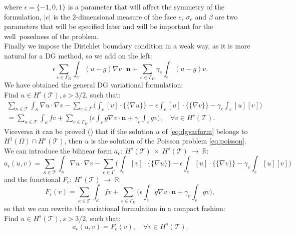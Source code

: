 \documentclass[12pt, a4paper]{article}
\theoremstyle{definition}
\theoremstyle{plain}
\theoremstyle{plain}
\begin{document}
where $\epsilon = \{-1, 0, 1\}$ is a parameter that will affect the symmetry of the formulation, $|e|$ is the $2$-dimensional measure of the face $e$, $\sigma_e$ and $\beta$ are two parameters that will be specified later and will be important for the well~posedness of the problem.\\
Finally we impose the Dirichlet boundary condition in a weak way, as it is more natural for a DG method, so we add on the left:
\begin{equation*}
	\epsilon \sum_{e \in \Gamma_D} \int_e (u-g) \nabla v \cdot \mathbf{n}
	+ \sum_{e \in \Gamma_D} \gamma_e \int_e (u-g)v.
\end{equation*}
We have obtained the general DG variational formulation:\\
Find $u \in H^s(\mathcal{T}), s>3/2$, such that:
\begin{multline*}
	\sum_{\kappa \in \mathcal{T}} \int_\kappa \nabla u \cdot \nabla v 
	-\sum_{e \in \Gamma} \bigg( \int_e [v] \cdot \{\!\!\{ \nabla u \}\!\!\}
	-\epsilon \int_e [u] \cdot \{\!\!\{ \nabla v \}\!\!\}
	- \gamma_e \int_e [u][v] \bigg)\\
	= \sum_{\kappa \in \mathcal{T}} \int_\kappa fv
	+ \sum_{e \in \Gamma_D} \bigg( \epsilon \int_e g \nabla v \cdot \mathbf{n}
	+ \gamma_e \int_e gv \bigg), \quad \forall v \in H^s(\mathcal{T}).
\end{multline*}
Viceversa it can be proved (\cite{riviere}) that if the solution $u$ of \eqref{eq:dgvarform} belongs to $H^1(\Omega) \cap H^s(\mathcal{T})$, then $u$ is the solution of the Poisson problem \eqref{eq:poisson}.\\
We can introduce the bilinear form $a_\epsilon:~H^s(\mathcal{T})~\times~H^s(\mathcal{T})~\rightarrow~\mathbb{R}$:
\begin{equation*}
a_\epsilon(u, v) = \sum_{\kappa \in \mathcal{T}} \int_\kappa \nabla u \cdot \nabla v
-\sum_{e \in \Gamma} \bigg( \int_e [v] \cdot \{\!\!\{ \nabla u \}\!\!\}
-\epsilon \int_e [u] \cdot \{\!\!\{ \nabla v \}\!\!\}
- \gamma_e \int_e [u][v] \bigg)
\end{equation*}
and the functional $F_\epsilon:~H^s(\mathcal{T})~\rightarrow~\mathbb{R}$:
\begin{equation*}
	F_\epsilon(v) = \sum_{\kappa \in \mathcal{T}} \int_\kappa fv
	+ \sum_{e \in \Gamma_D} \bigg( \epsilon \int_e g \nabla v \cdot \mathbf{n}
	+ \gamma_e \int_e gv \bigg),
\end{equation*}
so that we can rewrite the variational formulation in a compact fashion:\\
Find $u \in H^s(\mathcal{T}), s>3/2$, such that:
\begin{equation} \label{eq:dgvarform}
	a_\epsilon(u, v) = F_\epsilon(v), \quad \forall v \in H^s(\mathcal{T}).
\end{equation}
\end{document}
